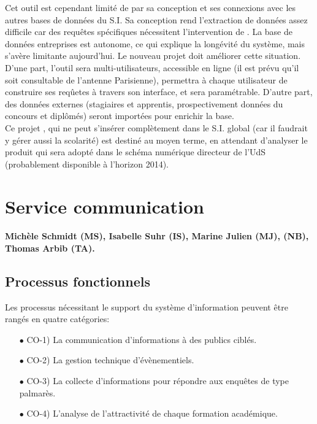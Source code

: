 \documentclass{book}
\begin{document}
Cet outil est cependant limité de par sa conception et ses connexions
avec les autres bases de données du S.I. Sa conception rend l'extraction
de données assez difficile car des requêtes spécifiques nécessitent 
l'intervention de \CK. La base de données entreprises est autonome, ce
qui explique la longévité du système, mais s'avère limitante aujourd'hui.
Le nouveau projet  doit améliorer cette situation. D'une part, l'outil
sera multi-utilisateurs, accessible en ligne (il est prévu qu'il soit 
consultable de l'antenne Parisienne), permettra à chaque utilisateur de 
construire ses reqûetes à travers son interface, et sera paramétrable. 
D'autre part, des données externes (stagiaires et apprentis, prospectivement 
données du concours et diplômés) seront importées pour enrichir la base.\\

Ce projet , qui ne peut s'insérer complètement dans le S.I. global
(car il faudrait y gérer aussi la scolarité) est destiné au moyen terme,
en attendant d'analyser le produit  qui sera adopté dans le schéma
numérique directeur de l'UdS (probablement disponible à l'horizon 2014). 

  

\section{Service communication}

\paragraph{Michèle Schmidt (MS), Isabelle Suhr (IS), Marine Julien (MJ), 
\NB (NB), Thomas Arbib (TA).}

\subsection{Processus fonctionnels}
Les processus nécessitant le support du système d'information peuvent 
être rangés en quatre catégories:
\begin{itemize}
\item[$\bullet$] CO-1) La communication d'informations à des publics ciblés.
\item[$\bullet$] CO-2) La gestion technique d'évènementiels.
\item[$\bullet$] CO-3) La collecte d'informations pour répondre aux enquêtes de type 
      palmarès.
\item[$\bullet$] CO-4) L'analyse de l'attractivité de chaque formation académique.
\end{itemize}
\bigskip
\end{document}
